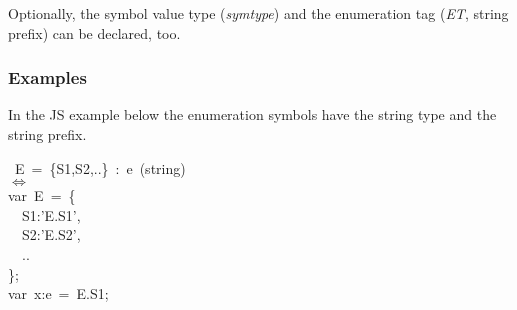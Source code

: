 \documentclass{article}
\begin{document}
\noindent{}Optionally, the symbol value type (\emph{symtype}) and the enumeration tag (\emph{ET}, string prefix) can be declared, too.%

\subsubsection{Examples}\label{sec3-examples1}%

\noindent{}In the JS example below the enumeration symbols have the string type and the  string prefix.%
\begin{mdpre}%
~E~=~\{S1,S2,..\}~:~e~(string)\\
\ensuremath{\Leftrightarrow}\\
{var}~E~=~\{\\
~~S1:{'}{E.S1}{'},\\
~~S2:{'}{E.S2}{'},\\
~~..\\
\};\\
{var}~x:e~=~E.S1;%
\end{mdpre}%
\end{document}
